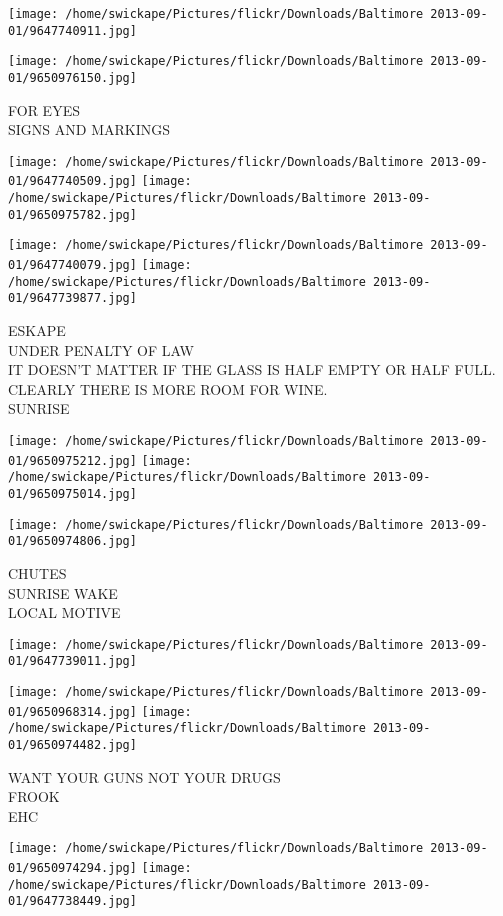 \documentclass[10pt,letterpaper]{article}
\begin{document}
\texttt{[image: /home/swickape/Pictures/flickr/Downloads/Baltimore 2013-09-01/9647740911.jpg]}

\vspace{0.25in}
\texttt{[image: /home/swickape/Pictures/flickr/Downloads/Baltimore 2013-09-01/9650976150.jpg]}

FOR EYES\\
SIGNS AND MARKINGS
\pagebreak

\texttt{[image: /home/swickape/Pictures/flickr/Downloads/Baltimore 2013-09-01/9647740509.jpg]}
\texttt{[image: /home/swickape/Pictures/flickr/Downloads/Baltimore 2013-09-01/9650975782.jpg]}

\texttt{[image: /home/swickape/Pictures/flickr/Downloads/Baltimore 2013-09-01/9647740079.jpg]}
\texttt{[image: /home/swickape/Pictures/flickr/Downloads/Baltimore 2013-09-01/9647739877.jpg]}

ESKAPE\\
UNDER PENALTY OF LAW\\
IT DOESN'T MATTER IF THE GLASS IS HALF EMPTY OR HALF FULL.  CLEARLY THERE IS MORE ROOM FOR WINE.\\
SUNRISE
\pagebreak

\texttt{[image: /home/swickape/Pictures/flickr/Downloads/Baltimore 2013-09-01/9650975212.jpg]}
\texttt{[image: /home/swickape/Pictures/flickr/Downloads/Baltimore 2013-09-01/9650975014.jpg]}

\texttt{[image: /home/swickape/Pictures/flickr/Downloads/Baltimore 2013-09-01/9650974806.jpg]}

CHUTES\\
SUNRISE WAKE\\
LOCAL MOTIVE
\pagebreak

\texttt{[image: /home/swickape/Pictures/flickr/Downloads/Baltimore 2013-09-01/9647739011.jpg]}

\vspace{0.25in}
\texttt{[image: /home/swickape/Pictures/flickr/Downloads/Baltimore 2013-09-01/9650968314.jpg]}
\texttt{[image: /home/swickape/Pictures/flickr/Downloads/Baltimore 2013-09-01/9650974482.jpg]}

WANT YOUR GUNS NOT YOUR DRUGS\\
FROOK\\
EHC
\pagebreak

\texttt{[image: /home/swickape/Pictures/flickr/Downloads/Baltimore 2013-09-01/9650974294.jpg]}
\texttt{[image: /home/swickape/Pictures/flickr/Downloads/Baltimore 2013-09-01/9647738449.jpg]}
\end{document}
